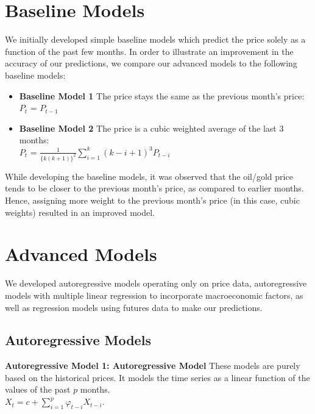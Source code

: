 \documentclass[runningheads]{llncs}
\begin{document}
\newpage

\section{Baseline Models}
We initially developed simple baseline models which predict the price solely as a function of the past few months. In order to illustrate an improvement in the accuracy of our predictions, we compare our advanced models to the following baseline models:

\begin {itemize}
\item \textbf{Baseline Model 1} The price stays the same as the previous month's price: \\
$P_{t}$ = $P_{t-1}$\\
\item \textbf{Baseline Model 2} The price is a cubic weighted average of the last 3 months: \\
$P_{t}$ = $\frac{1}{\{k(k+1)\}^2}\sum\limits_{i=1}^k (k-i+1)^3P_{t-i}$
\end {itemize}

\noindent While developing the baseline models, it was observed that the oil/gold price tends to be closer to the previous month's price, as compared to earlier months. Hence, assigning more weight to the previous month's price (in this case, cubic weights) resulted in an improved model.  \\

\section{Advanced Models}

We developed autoregressive models operating only on price data, autoregressive models with multiple linear regression to incorporate macroeconomic factors, as well as regression models using futures data to make our predictions. \\

\subsection{Autoregressive Models}
\noindent\textbf{Autoregressive Model 1: Autoregressive Model} These models are purely based on the historical prices. It models the time series as a linear function of the values of the past $p$ months.\\

$ X_{t} = c + \sum\limits_{i=1}^p \varphi_{t-i}X_{t-i}$. \\
\end{document}
